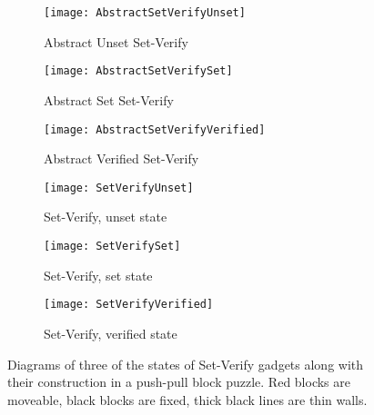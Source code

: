 \begin{figure}[!ht]
  \centering
    \begin{subfigure}[b]{0.3\textwidth}
    \texttt{[image: AbstractSetVerifyUnset]}
    \caption{Abstract Unset Set-Verify}
    \vspace{15pt}
    \end{subfigure}
    \hfill
    \begin{subfigure}[b]{0.3\textwidth}
    \texttt{[image: AbstractSetVerifySet]}
    \caption{Abstract Set Set-Verify}
    \vspace{15pt}
    \end{subfigure}
    \hfill
    \begin{subfigure}[b]{0.3\textwidth}
    \texttt{[image: AbstractSetVerifyVerified]}
    \caption{Abstract Verified Set-Verify}
    \vspace{15pt}
  \end{subfigure}  
   \vspace{10pt}
  \begin{subfigure}[b]{0.3\textwidth}
    \texttt{[image: SetVerifyUnset]}
    \caption{Set-Verify, unset state}
    \label{SetVerifyUnset}
  \end{subfigure}
  \hfill
  \begin{subfigure}[b]{0.3\textwidth}
    \texttt{[image: SetVerifySet]}
    \caption{Set-Verify, set state}
    \label{SetVerifySet}
  \end{subfigure}
  \hfill
  \begin{subfigure}[b]{0.3\textwidth}
    \texttt{[image: SetVerifyVerified]}
    \caption{Set-Verify, verified state}
    \label{SetVerifyVerified}
  \end{subfigure}
  \caption{Diagrams of three of the states of Set-Verify gadgets along with their construction in a push-pull block puzzle. Red blocks are moveable, black blocks are fixed, thick black lines are thin walls.}
  \label{setVerifyDiagrams}
\end{figure}


